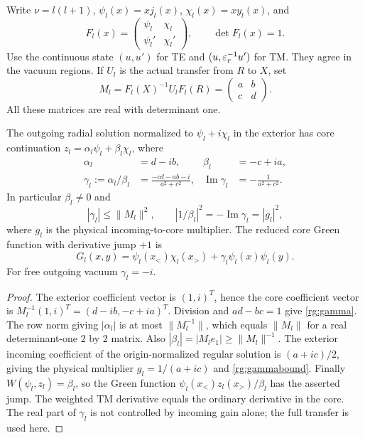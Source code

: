 Write $\nu=l(l+1)$, $\psi_l(x)=xj_l(x)$, $\chi_l(x)=xy_l(x)$, and
\begin{equation}\label{rg:F}
 F_l(x)=
 \begin{pmatrix}\psi_l&\chi_l\\\psi_l'&\chi_l'\end{pmatrix},
 \qquad \det F_l(x)=1.
\end{equation}
Use the continuous state $(u,u')$ for TE and
$(u,\varepsilon_r^{-1}u')$ for TM. They agree in the vacuum regions.
If $U_l$ is the actual transfer from $R$ to $X$, set
\[
 M_l=F_l(X)^{-1}U_lF_l(R)=
       \begin{pmatrix}a&b\\c&d\end{pmatrix}.
\]
All these matrices are real with determinant one.

\begin{lemma}\label{rg:coefficient}
The outgoing radial solution normalized to $\psi_l+i\chi_l$
in the exterior has core continuation
$z_l=\alpha_l\psi_l+\beta_l\chi_l$, where
\begin{align}
 \alpha_l&=d-ib,&\beta_l&=-c+ia,\nonumber\\
 \gamma_l:=\alpha_l/\beta_l
   &=\frac{-cd-ab-i}{a^2+c^2},&
 \operatorname{Im}\gamma_l&=-\frac1{a^2+c^2}.
 \label{rg:gamma}
\end{align}
In particular $\beta_l\ne0$ and
\begin{equation}\label{rg:gammabound}
 |\gamma_l|\leq\|M_l\|^2,\qquad
 |1/\beta_l|^2=-\operatorname{Im}\gamma_l=|g_l|^2,
\end{equation}
where $g_l$ is the physical incoming-to-core multiplier.
The reduced core Green function with derivative jump $+1$ is
\begin{equation}\label{rg:scalarGreen}
 G_l(x,y)=\psi_l(x_<)\chi_l(x_>)
                     +\gamma_l\psi_l(x)\psi_l(y).
\end{equation}
For free outgoing vacuum $\gamma_l=-i$.
\end{lemma}
\begin{proof}
The exterior coefficient vector is $(1,i)^T$, hence the core
coefficient vector is $M_l^{-1}(1,i)^T=(d-ib,-c+ia)^T$.
Division and $ad-bc=1$ give \eqref{rg:gamma}.
The row norm giving $|\alpha_l|$ is at most $\|M_l^{-1}\|$,
which equals $\|M_l\|$ for a real determinant-one $2$ by $2$
matrix. Also $|\beta_l|=|M_le_1|\geq\|M_l\|^{-1}$.
The exterior incoming coefficient of the origin-normalized
regular solution is $(a+ic)/2$, giving the physical multiplier
$g_l=1/(a+ic)$ and \eqref{rg:gammabound}.
Finally $W(\psi_l,z_l)=\beta_l$, so the Green function
$\psi_l(x_<)z_l(x_>)/\beta_l$ has the asserted jump.
The weighted TM derivative equals the ordinary derivative in
the core. The real part of $\gamma_l$ is not controlled by
incoming gain alone; the full transfer is used here.
\end{proof}

